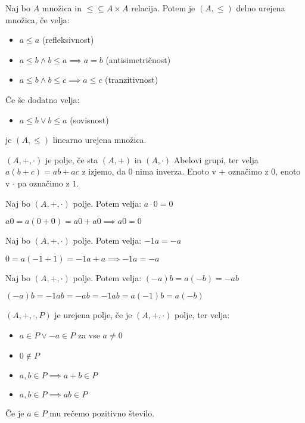 \begin{definicija}
    Naj bo $A$ množica in $\leq \subseteq A \times A$ relacija.
    Potem je $(A, \leq)$ delno urejena množica, če velja:
    \begin{itemize}
        \item $a \leq a$ (refleksivnost)
        \item $a \leq b \wedge b \leq a \implies a = b$ (antisimetričnost)
        \item $a \leq b \wedge b \leq c \implies a \leq c$ (tranzitivnost)
    \end{itemize}
    Če še dodatno velja:
    \begin{itemize}
        \item $a \leq b \vee b \leq a$ (sovisnost)
    \end{itemize}
    je $(A, \leq)$ linearno urejena množica.
\end{definicija}

\begin{definicija}
    $(A, +, \cdot)$ je polje, če sta $(A, +)$ in $(A, \cdot)$ Abelovi grupi, ter velja $a(b + c) = ab + ac$ z izjemo, da $0$ nima inverza.
    Enoto v $+$ označimo z $0$, enoto v $\cdot$ pa označimo z $1$.
\end{definicija}

\begin{trditev}
    Naj bo $(A, +, \cdot)$ polje.
    Potem velja: $a \cdot 0 = 0$
\end{trditev}
\begin{dokaz}
    $a0 = a(0 + 0) = a0 + a0 \implies a0 = 0$
\end{dokaz}

\begin{trditev}
    Naj bo $(A, +, \cdot)$ polje.
    Potem velja: $-1a = -a$
\end{trditev}
\begin{dokaz}
    $0 = a(-1 + 1) = -1a + a \implies -1a = -a$
\end{dokaz}

\begin{trditev}
    Naj bo $(A, +, \cdot)$ polje.
    Potem velja: $(-a)b = a(-b) = -ab$
\end{trditev}
\begin{dokaz}
    $(-a)b = -1ab = -ab = -1ab = a(-1)b = a(-b)$
\end{dokaz}

\begin{definicija}
    $(A, +, \cdot, P)$ je urejena polje, če je $(A, +, \cdot)$ polje, ter velja:
    \begin{itemize}
        \item $a \in P \vee -a \in P$ za vse $a \neq 0$
        \item $0 \notin P$
        \item $a, b \in P \implies a + b \in P$
        \item $a, b \in P \implies ab \in P$
    \end{itemize}
    Če je $a \in P$ mu rečemo pozitivno število.
\end{definicija}

